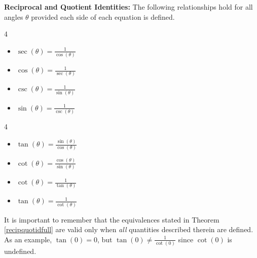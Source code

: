 \documentclass{ximera}
\begin{document}
\begin{theorem} \label{recipquotidfull}  \textbf{Reciprocal and Quotient Identities:}    The following relationships hold for all angles $\theta$ provided each side of each equation is defined.

\begin{multicols}{4}

\begin{itemize}

\item $\sec(\theta) = \frac{1}{\cos(\theta)}$ 

\item $\cos(\theta) = \frac{1}{\sec(\theta)}$

\item $\csc(\theta) = \frac{1}{\sin(\theta)}$

\item $\sin(\theta) = \frac{1}{\csc(\theta)}$

\end{itemize}

\end{multicols}


\begin{multicols}{4}

\begin{itemize}

\item $\tan(\theta) = \frac{\sin(\theta)}{\cos(\theta)}$

\item $\cot(\theta) = \frac{\cos(\theta)}{\sin(\theta)}$

\item $\cot(\theta) = \frac{1}{\tan(\theta)}$

\item $\tan(\theta) = \frac{1}{\cot(\theta)}$

\end{itemize}

\end{multicols}

\smallskip

\end{theorem}


\smallskip

It is important to remember that the equivalences stated in Theorem \ref{recipquotidfull}  are valid only when \textit{all} quantities described therein are defined.  As an example, $\tan(0) = 0$, but $\tan(0) \neq \frac{1}{\cot(0)}$ since $\cot(0)$ is undefined.
\end{document}
